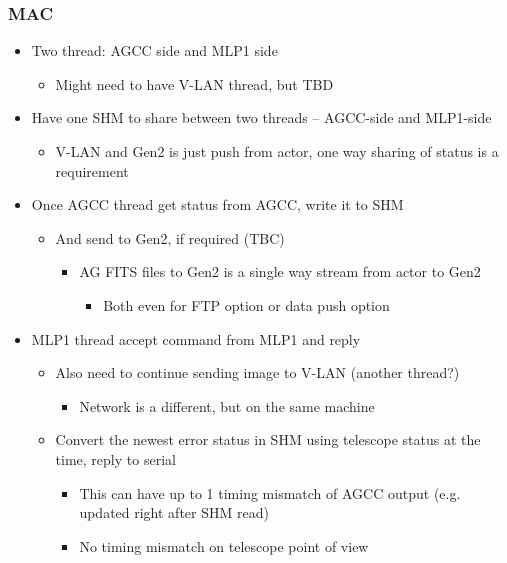 \documentclass[a4paper,notitlepage]{article}
\begin{document}
\subsubsection{MAC}
\begin{itemize}
  \item Two thread: AGCC side and MLP1 side
  \begin{itemize}
    \item Might need to have V-LAN thread, but TBD
  \end{itemize}
  \item Have one SHM to share between two threads -- AGCC-side and MLP1-side
  \begin{itemize}
    \item V-LAN and Gen2 is just push from actor, one way sharing of status is a requirement
  \end{itemize}
  \item Once AGCC thread get status from AGCC, write it to SHM
  \begin{itemize}
    \item And send to Gen2, if required (TBC)
    \begin{itemize}
      \item AG FITS files to Gen2 is a single way stream from actor to Gen2
      \begin{itemize}
        \item Both even for FTP option or data push option
      \end{itemize}
    \end{itemize}
  \end{itemize}
  \item MLP1 thread accept command from MLP1 and reply
  \begin{itemize}
    \item Also need to continue sending image to V-LAN (another thread?)
    \begin{itemize}
      \item Network is a different, but on the same machine
    \end{itemize}
    \item Convert the newest error status in SHM using telescope status at the time, reply to serial
    \begin{itemize}
      \item This can have up to 1 timing mismatch of AGCC output (e.g. updated right after SHM read)
      \item No timing mismatch on telescope point of view
    \end{itemize}
  \end{itemize}
\end{itemize}
\end{document}
